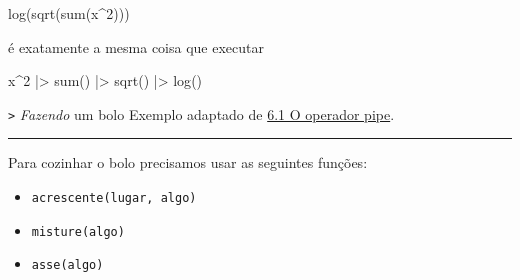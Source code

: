 \documentclass[
  10pt,
  ignorenonframetext,
]{beamer}
\newenvironment{Shaded}{\begin{snugshade}}{\end{snugshade}}
\newcommand{\DecValTok}[1]{\textcolor[rgb]{0.68,0.00,0.00}{#1}}
\newcommand{\FunctionTok}[1]{\textcolor[rgb]{0.28,0.35,0.67}{#1}}
\newcommand{\NormalTok}[1]{\textcolor[rgb]{0.00,0.23,0.31}{#1}}
\newcommand{\SpecialCharTok}[1]{\textcolor[rgb]{0.37,0.37,0.37}{#1}}
\providecommand{\tightlist}{%
  \setlength{\itemsep}{0pt}\setlength{\parskip}{0pt}}\usepackage{longtable,booktabs,array}
\newcommand*{\regrafina}{\rule{\textwidth}{0.5pt}}
\begin{document}
\begin{frame}[fragile]
\begin{Shaded}
\begin{Highlighting}[]
\FunctionTok{log}\NormalTok{(}\FunctionTok{sqrt}\NormalTok{(}\FunctionTok{sum}\NormalTok{(x}\SpecialCharTok{\^{}}\DecValTok{2}\NormalTok{)))}
\end{Highlighting}
\end{Shaded}

é exatamente a mesma coisa que executar

\begin{Shaded}
\begin{Highlighting}[]
\NormalTok{x}\SpecialCharTok{\^{}}\DecValTok{2} \SpecialCharTok{|\textgreater{}} \FunctionTok{sum}\NormalTok{() }\SpecialCharTok{|\textgreater{}} \FunctionTok{sqrt}\NormalTok{() }\SpecialCharTok{|\textgreater{}} \FunctionTok{log}\NormalTok{()}
\end{Highlighting}
\end{Shaded}
\end{frame}

\begin{frame}[fragile]{\texttt{\textbar{}\textgreater{}}
\newline \emph{Fazendo} um bolo}
\protect\hypertarget{fazendo-um-bolo}{}
Exemplo adaptado de
\href{https://livro.curso-r.com/6-1-o-operador-pipe.html}{6.1 O operador
pipe}.

\regrafina

Para cozinhar o bolo precisamos usar as seguintes funções:

\begin{itemize}
\tightlist
\item
  \texttt{acrescente(lugar,\ algo)}
\item
  \texttt{misture(algo)}
\item
  \texttt{asse(algo)}
\end{itemize}
\end{frame}
\end{document}
